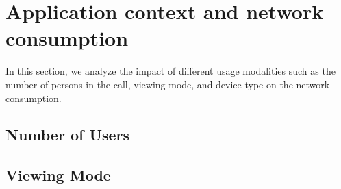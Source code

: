 \section{Application context and network consumption}\label{sec:usage_modality}
In this section, we analyze the impact of different usage modalities such as the number of persons in the call, viewing mode, and device type on the network consumption. 
\subsection{Number of Users}
\subsection{Viewing Mode}

